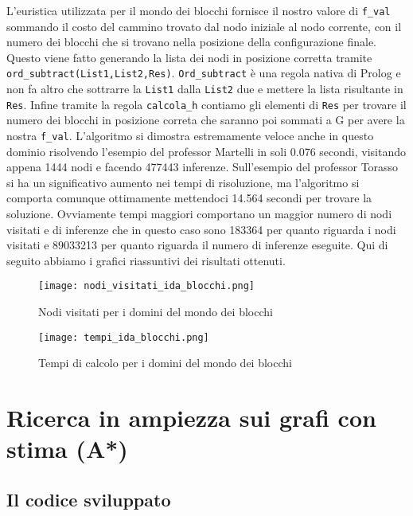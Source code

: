 L'euristica utilizzata per il mondo dei blocchi fornisce il nostro valore di \lstinline{f_val} sommando il costo del cammino trovato dal nodo iniziale al nodo corrente, con il numero dei blocchi che si trovano nella posizione della configurazione finale. Questo viene fatto generando la lista dei nodi in posizione corretta tramite \lstinline{ord_subtract(List1,List2,Res)}. \lstinline{Ord_subtract} è una regola nativa di Prolog e non fa altro che sottrarre la \lstinline{List1} dalla \lstinline{List2} due e mettere la lista risultante in \lstinline{Res}. Infine tramite la regola \lstinline{calcola_h} contiamo gli elementi di \lstinline{Res} per trovare il numero dei blocchi in posizione correta che saranno poi sommati a G per avere la nostra \lstinline{f_val}. L'algoritmo si dimostra estremamente veloce anche in questo dominio risolvendo l'esempio del professor Martelli in soli 0.076 secondi, visitando appena 1444 nodi e facendo 477443 inferenze. Sull'esempio del professor Torasso si ha un significativo aumento nei tempi di risoluzione, ma l'algoritmo si comporta comunque ottimamente mettendoci 14.564 secondi per trovare la soluzione. Ovviamente tempi maggiori comportano un maggior numero di nodi visitati e di inferenze che in questo caso sono 183364 per quanto riguarda i nodi visitati e 89033213 per quanto riguarda il numero di inferenze eseguite.
Qui di seguito abbiamo i grafici riassuntivi dei risultati ottenuti.

\begin{figure}[htp]
  \texttt{[image: nodi\_visitati\_ida\_blocchi.png]}
  \caption{Nodi visitati per i domini del mondo dei blocchi}
  \label{fig:figure11}
\end{figure}

\begin{figure}[htp]
  \texttt{[image: tempi\_ida\_blocchi.png]}
  \caption{Tempi di calcolo per i domini del mondo dei blocchi}
  \label{fig:figure12}
\end{figure}


\section{Ricerca in ampiezza sui grafi con stima (A*)}

\subsection{Il codice sviluppato}

